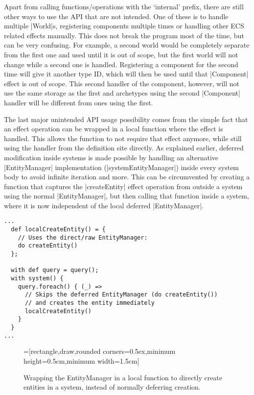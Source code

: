 Apart from calling functions/operations with the `internal' prefix, there are still other ways to use the API that are not intended. One of these is to handle multiple |World|s, registering components multiple times or handling other ECS related effects manually. This does not break the program most of the time, but can be very confusing. For example, a second world would be completely separate from the first one and used until it is out of scope, but the first world will not change while a second one is handled. Registering a component for the second time will give it another type ID, which will then be used until that |Component| effect is out of scope. This second handler of the component, however, will not use the same storage as the first and archetypes using the second |Component| handler will be different from ones using the first.

The last major unintended API usage possibility comes from the simple fact that an effect operation can be wrapped in a local function where the effect is handled. This allows the function to not require that effect anymore, while still using the handler from the definition site directly. As explained earlier, deferred modification inside systems is made possible by handling an alternative |EntityManager| implementation (|systemEntityManager|) inside every system body to avoid infinite iteration and more. This can be circumvented by creating a function that captures the |createEntity| effect operation from outside a system using the normal |EntityManager|, but then calling that function inside a system, where it is now independent of the local deferred |EntityManager|.

\newsavebox{\localfunctionwrap}
\begin{lrbox}{\localfunctionwrap}
\begin{lstlisting}
...
  def localCreateEntity() = {
    // Uses the direct/raw EntityManager:
    do createEntity()
  };

  with def query = query();
  with system() {
    query.foreach() { (_) =>
	  // Skips the deferred EntityManager (do createEntity())
	  // and creates the entity immediately
      localCreateEntity()
    }
  }
...
\end{lstlisting}
\end{lrbox}

\begin{figure}[h!]
\centering
{}=[rectangle,draw,rounded corners=0.5ex,minimum height=0.5cm,minimum width=1.5cm]
\caption{Wrapping the EntityManager in a local function to directly create entities in a system, instead of normally deferring creation.}
\label{fig:localfunctionwrap}
\end{figure}

